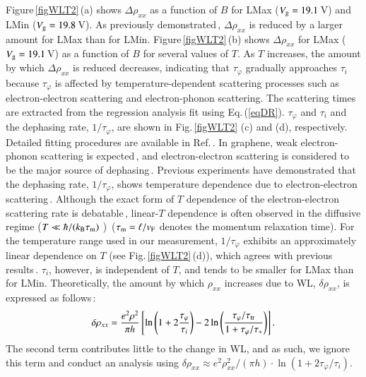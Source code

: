 \documentclass[final,5p,times,twocolumn]{elsarticle}
\begin{document}
Figure\,\ref{figWLT2}\,(a) shows $\Delta \rho_{xx}$ as a function of $B$ for LMax ($V_{\rm g}= 19.1$\,V) and LMin ($V_{\rm g}= 19.8$\,V). 
As previously demonstrated\,\cite{GrWL}, $\Delta \rho_{xx}$ is reduced by a larger amount for LMax than for LMin.
Figure\,\ref{figWLT2}\,(b) shows $\Delta \rho_{xx}$ for LMax ($V_{\rm g}= 19.1$\,V) as a function of $B$ for several values of $T$.
As $T$ increases, the amount by which $ \Delta\rho_{xx}$ is reduced decreases, indicating that $\tau_\varphi$ gradually approaches $\tau_i$ because $\tau_\varphi$ is affected by temperature-dependent scattering processes such as electron-electron scattering and electron-phonon scattering.
The scattering times are extracted from the regression analysis fit using Eq.\,(\ref{eqDR}). 
$\tau_\varphi$ and $\tau_i$ and the dephasing rate, $1/\tau_\varphi$, are shown in Fig.\,\ref{figWLT2} (c) and (d), respectively.
Detailed fitting procedures are available in Ref.\,\cite{GrWL}.
%
In graphene, weak electron-phonon scattering is expected\,\cite{Stauber,Hwang},
and electron-electron scattering is considered to be the major source of dephasing\,\cite{Tikhonenko,Tikhonenko2}.
Previous experiments have demonstrated that  the dephasing rate, $1/\tau_\varphi$, shows temperature dependence due to electron-electron scattering\,\cite{Tikhonenko,Tikhonenko2,Ki}.
Although the exact form of $T$ dependence of the electron-electron scattering rate is debatable\,\cite{AltshulerAronovKhmelnitsky,FukuyamaAbrahams,Narozhny}, linear-$T$ dependence is often observed in the diffusive regime ($T\ll \hbar/(k_{\rm B}\tau_{\rm m})$ )\,\cite{Tikhonenko} ($\tau_{\rm m}=\ell/v_{\rm F}$ denotes the momentum relaxation time).
For the temperature range used in our measurement,
$1/\tau_\varphi$ exhibits an approximately linear dependence on $T$ (see Fig.\,\ref{figWLT2}\,(d)),
which agrees with previous results\,\cite{Tikhonenko}.
$\tau_i$, however, is independent of $T$, and tends to be smaller for LMax than for LMin.
%
Theoretically, the amount by which $\rho_{xx}$ increases due to WL, $\delta \rho_{xx}$, is expressed as follows\,\cite{McCann}:
\begin{equation}
\delta\rho_{xx} = \frac{e^2 \rho^2}{\pi h}\left [ \ln\left(1+2\frac{\tau_\varphi}{\tau_i} \right) - 2\ln \left(\frac{\tau_\varphi/\tau_{\rm tr}}{1+\tau_\varphi/\tau_\ast} \right) \right].  \label{eq_deltarhoT}
\end{equation}
The second term contributes little to the change in WL, and as such, we ignore this term and conduct an analysis using $\delta\rho_{xx} \approx e^2\rho_{xx}^2/(\pi h) \cdot \ln (1+2\tau_\varphi/\tau_i )$. 
\end{document}

